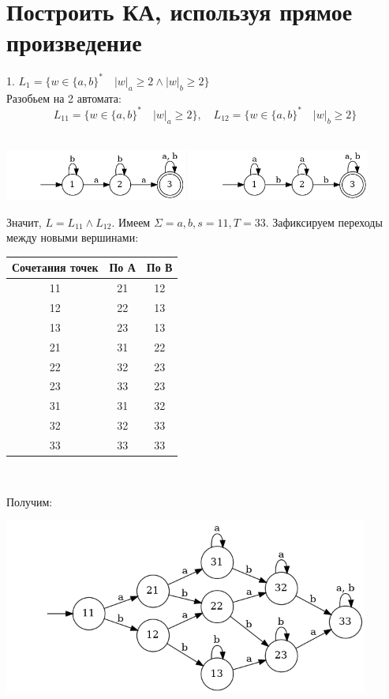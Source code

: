 \documentclass{article}
\begin{document}
\section{Построить КА, используя прямое произведение}

    1. $L_1 = \{w \in \{a, b\}^* \quad |w|_a \geq 2 \wedge |w|_b \geq 2\}$\\
    Разобьем на 2 автомата:
    $$L_11 = \{w \in \{a, b\}^* \quad |w|_a \geq 2\}, \quad L_12 = \{w \in \{a, b\}^* \quad |w|_b \geq 2\}$$\\
    \begin{center}
        \includegraphics[width=0.45\textwidth]{pic7.dot}
        \includegraphics[width=0.45\textwidth]{pic4.dot}
    \end{center}
    Значит, $L = L_11 \wedge L_12$. Имеем $\Sigma = {a, b}, s = 11, T = 33$. Зафиксируем переходы между новыми вершинами:
    \begin{center}
        \begin{tabular}{|c|c|c|}
            \hline
            Сочетания точек & По А & По В \\
            \hline
            11 & 21 & 12\\
            12 & 22 & 13\\
            13 & 23 & 13\\
            21 & 31 & 22\\
            22 & 32 & 23\\
            23 & 33 & 23\\
            31 & 31 & 32\\
            32 & 32 & 33\\
            33 & 33 & 33\\
            \hline
        \end{tabular}\\
    \end{center}
    Получим:
    \begin{center}
        \includegraphics[width=0.9\textwidth]{pic8.dot}\\
    \end{center}
    
\end{document}

